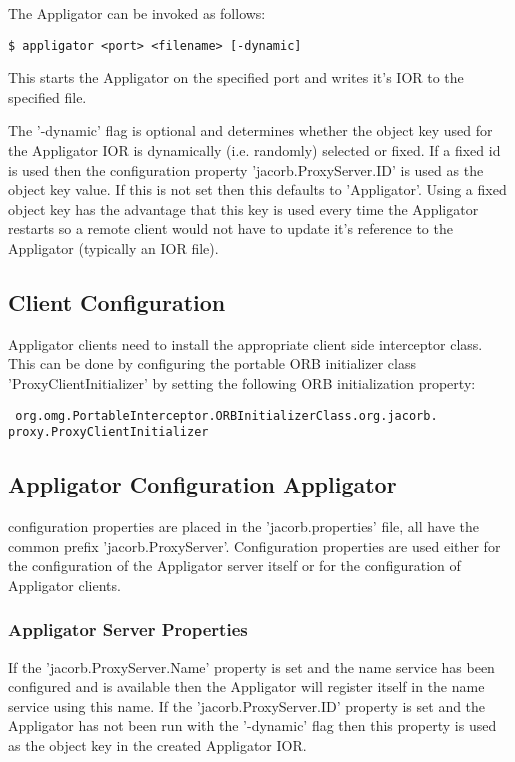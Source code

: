 \documentclass[12pt]{scrbook}
\begin{document}
The Appligator can be invoked as follows:

\verb+$ appligator <port> <filename> [-dynamic]+

This starts the Appligator on the specified port and writes it's IOR
to the specified file.

The '-dynamic' flag is optional and determines whether the object key
used for the Appligator IOR is dynamically (i.e. randomly) selected or
fixed. If a fixed id is used then the configuration property
'jacorb.ProxyServer.ID' is used as the object key value. If this is
not set then this defaults to 'Appligator'. Using a fixed object key
has the advantage that this key is used every time the Appligator
restarts so a remote client would not have to update it's reference to
the Appligator (typically an IOR file).

\subsection{Client Configuration}

Appligator clients need to install the appropriate client side
interceptor class. This can be done by configuring the portable ORB
initializer class 'ProxyClientInitializer' by setting the following
ORB initialization property:

{\noindent\tt\small
  org.omg.PortableInterceptor.ORBInitializerClass.org.jacorb.\\
proxy.ProxyClientInitializer}

\subsection{Appligator Configuration Appligator}

configuration properties are
placed in the 'jacorb.properties' file, all have the common prefix
'jacorb.ProxyServer'. Configuration properties are used either for the
configuration of the Appligator server itself or for the configuration
of Appligator clients.  

\subsubsection{Appligator Server Properties}

If the 'jacorb.ProxyServer.Name' property is set and the name service
has been configured and is available then the Appligator will register
itself in the name service using this name.  If the
'jacorb.ProxyServer.ID' property is set and the Appligator has not
been run with the '-dynamic' flag then this property is used as the
object key in the created Appligator IOR.
\end{document}
